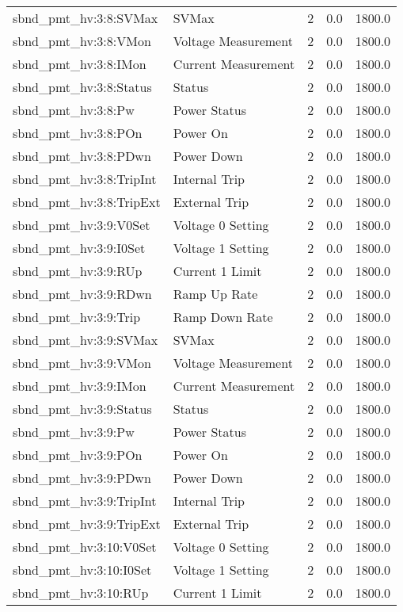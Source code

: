 \begin{center}
\begin{longtable}{l | l l l l }
sbnd\_pmt\_hv:3:8:SVMax & SVMax & 2 & 0.0 & 1800.0\\ 
sbnd\_pmt\_hv:3:8:VMon & Voltage Measurement & 2 & 0.0 & 1800.0\\ 
sbnd\_pmt\_hv:3:8:IMon & Current Measurement & 2 & 0.0 & 1800.0\\ 
sbnd\_pmt\_hv:3:8:Status & Status & 2 & 0.0 & 1800.0\\ 
sbnd\_pmt\_hv:3:8:Pw & Power Status & 2 & 0.0 & 1800.0\\ 
sbnd\_pmt\_hv:3:8:POn & Power On & 2 & 0.0 & 1800.0\\ 
sbnd\_pmt\_hv:3:8:PDwn & Power Down & 2 & 0.0 & 1800.0\\ 
sbnd\_pmt\_hv:3:8:TripInt & Internal Trip & 2 & 0.0 & 1800.0\\ 
sbnd\_pmt\_hv:3:8:TripExt & External Trip & 2 & 0.0 & 1800.0\\ 
sbnd\_pmt\_hv:3:9:V0Set & Voltage 0 Setting & 2 & 0.0 & 1800.0\\ 
sbnd\_pmt\_hv:3:9:I0Set & Voltage 1 Setting & 2 & 0.0 & 1800.0\\ 
sbnd\_pmt\_hv:3:9:RUp & Current 1 Limit & 2 & 0.0 & 1800.0\\ 
sbnd\_pmt\_hv:3:9:RDwn & Ramp Up Rate & 2 & 0.0 & 1800.0\\ 
sbnd\_pmt\_hv:3:9:Trip & Ramp Down Rate & 2 & 0.0 & 1800.0\\ 
sbnd\_pmt\_hv:3:9:SVMax & SVMax & 2 & 0.0 & 1800.0\\ 
sbnd\_pmt\_hv:3:9:VMon & Voltage Measurement & 2 & 0.0 & 1800.0\\ 
sbnd\_pmt\_hv:3:9:IMon & Current Measurement & 2 & 0.0 & 1800.0\\ 
sbnd\_pmt\_hv:3:9:Status & Status & 2 & 0.0 & 1800.0\\ 
sbnd\_pmt\_hv:3:9:Pw & Power Status & 2 & 0.0 & 1800.0\\ 
sbnd\_pmt\_hv:3:9:POn & Power On & 2 & 0.0 & 1800.0\\ 
sbnd\_pmt\_hv:3:9:PDwn & Power Down & 2 & 0.0 & 1800.0\\ 
sbnd\_pmt\_hv:3:9:TripInt & Internal Trip & 2 & 0.0 & 1800.0\\ 
sbnd\_pmt\_hv:3:9:TripExt & External Trip & 2 & 0.0 & 1800.0\\ 
sbnd\_pmt\_hv:3:10:V0Set & Voltage 0 Setting & 2 & 0.0 & 1800.0\\ 
sbnd\_pmt\_hv:3:10:I0Set & Voltage 1 Setting & 2 & 0.0 & 1800.0\\ 
sbnd\_pmt\_hv:3:10:RUp & Current 1 Limit & 2 & 0.0 & 1800.0\\ 

\end{longtable}
\end{center}
